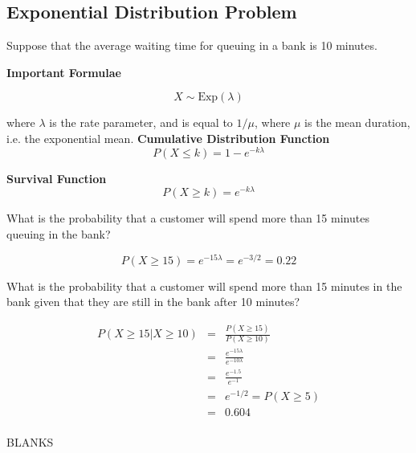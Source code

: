 \documentclass[a4paper,12pt]{article}
\begin{document}
\large 

\subsection*{Exponential Distribution Problem}
\noindent Suppose that the average waiting time for queuing in a bank is 10 minutes.



\begin{framed}
\large 
\noindent \textbf{Important Formulae}

\[ X \sim \mbox{Exp}(\lambda) \]

\noindent where $\lambda$ is the rate parameter, and is equal to $1/\mu$, where $\mu$ is the mean duration, i.e. the exponential mean.
\medskip 
\noindent \textbf{Cumulative Distribution Function}
\[
P( X \leq k) = 1 -e^{-k\lambda }\]

\medskip 

\noindent \textbf{Survival Function}
\[
P( X \geq k) =e^{-k \lambda }\]


\end{framed}

\noindent What is the probability that a customer will spend more than 15 minutes queuing in the bank?

\[
P (X \geq 15) = e ^{-15\lambda}
= e ^{-3 / 2}
= 0.22
\]
\bigskip

\noindent What is the probability that a customer will spend more than 15 minutes in the bank given that they are still in the bank after 10 minutes?

\begin{eqnarray*}
P (X \geq 15|X \geq 10) &=& \frac{P (X \geq 15)}{P (X \geq 10)}\\
&=& \frac{e ^{-15\lambda}}{e ^{-10\lambda}}\\
&=& \frac{e ^{-1.5}}{e ^{-1}}\\
&=& e ^{-1 / 2} = P (X \geq 5) \\
&=&  0.604\\
\end{eqnarray*}

\newpage
BLANKS
\end{document}
